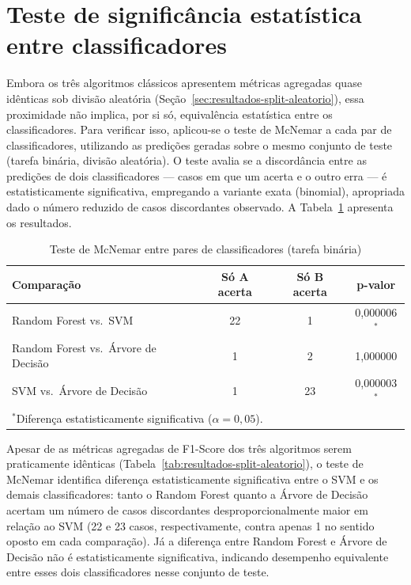 \section{Teste de significância estatística entre classificadores}
\label{sec:mcnemar}

Embora os três algoritmos clássicos apresentem métricas agregadas quase idênticas sob divisão aleatória (Seção~\ref{sec:resultados-split-aleatorio}), essa proximidade não implica, por si só, equivalência estatística entre os classificadores. Para verificar isso, aplicou-se o teste de McNemar \citep{mcnemar1947note} a cada par de classificadores, utilizando as predições geradas sobre o mesmo conjunto de teste (tarefa binária, divisão aleatória). O teste avalia se a discordância entre as predições de dois classificadores — casos em que um acerta e o outro erra — é estatisticamente significativa, empregando a variante exata (binomial), apropriada dado o número reduzido de casos discordantes observado. A Tabela~\ref{tab:mcnemar} apresenta os resultados.

\begin{table}[htbp]
\centering
\caption{Teste de McNemar entre pares de classificadores (tarefa binária)}
\label{tab:mcnemar}
\begin{tabular}{@{}lccc@{}}
\toprule
\textbf{Comparação} & \textbf{Só A acerta} & \textbf{Só B acerta} & \textbf{p-valor} \\
\midrule
Random Forest vs.\ SVM & 22 & 1 & 0{,}000006$^{*}$ \\
Random Forest vs.\ Árvore de Decisão & 1 & 2 & 1{,}000000 \\
SVM vs.\ Árvore de Decisão & 1 & 23 & 0{,}000003$^{*}$ \\
\bottomrule
\multicolumn{4}{l}{\footnotesize $^{*}$Diferença estatisticamente significativa ($\alpha = 0{,}05$).}
\end{tabular}
\end{table}

Apesar de as métricas agregadas de F1-Score dos três algoritmos serem praticamente idênticas (Tabela~\ref{tab:resultados-split-aleatorio}), o teste de McNemar identifica diferença estatisticamente significativa entre o SVM e os demais classificadores: tanto o Random Forest quanto a Árvore de Decisão acertam um número de casos discordantes desproporcionalmente maior em relação ao SVM (22 e 23 casos, respectivamente, contra apenas 1 no sentido oposto em cada comparação). Já a diferença entre Random Forest e Árvore de Decisão não é estatisticamente significativa, indicando desempenho equivalente entre esses dois classificadores nesse conjunto de teste.

